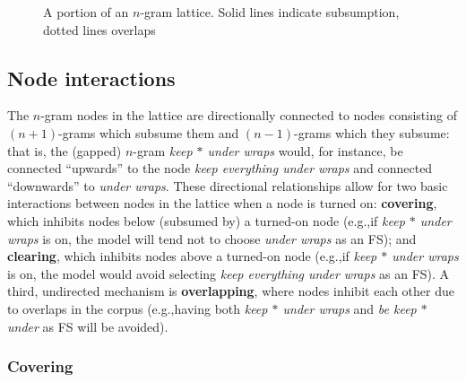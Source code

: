 \documentclass[11pt,letterpaper]{article}
\makeatletter
\def \eg {e.g.,\@ }
\newcommand{\gap}{$*$\xspace}
\newcommand{\ex}[1]{\textit{#1}\xspace}
\newcommand{\termdef}[1]{\textbf{#1}\xspace}
\makeatother
\begin{document}
\begin{figure}[!tb]
\caption{A portion of an $n$-gram lattice. Solid lines indicate subsumption, dotted lines overlaps}
\label{fig:example}
\end{figure}

\subsection{Node interactions}

The $n$-gram nodes in the lattice are directionally connected to nodes consisting of $(n+1)$-grams which subsume them and $(n-1)$-grams which they subsume: that is, the (gapped) $n$-gram \ex{keep \gap under wraps} would, for instance, be connected ``upwards'' to the node \ex{keep everything under wraps} and connected ``downwards'' to \ex{under wraps}. These directional relationships allow for two basic interactions between nodes in the lattice when a node is turned on: \termdef{covering}, which inhibits nodes below (subsumed by) a turned-on node (\eg if \ex{keep \gap under wraps} is on, the model will tend not to choose \ex{under wraps} as an FS); and \termdef{clearing}, which inhibits nodes above a turned-on node (\eg if \ex{keep \gap under wraps} is on, the model would avoid selecting \ex{keep everything under wraps} as an FS). A third, undirected mechanism is \termdef{overlapping}, where nodes inhibit each other due to overlaps in the corpus (\eg having both \ex{keep \gap under wraps} and \ex{be keep \gap under} as FS will be avoided).


\subsubsection{Covering}
\end{document}
